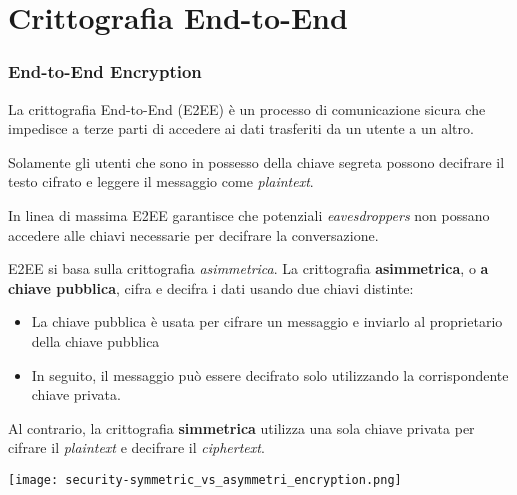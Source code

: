 \section{Crittografia End-to-End}
\begin{frame}
    \frametitle{End-to-End Encryption}
    La crittografia End-to-End (E2EE) è un processo di comunicazione sicura che impedisce a terze parti di accedere ai dati trasferiti da un utente a un altro.\newline\pause
    
    Solamente gli utenti che sono in possesso della chiave segreta possono decifrare il testo cifrato e leggere il messaggio come \textit{plaintext}.\newline\pause

    In linea di massima E2EE garantisce che potenziali \textit{eavesdroppers} non possano accedere alle chiavi necessarie per decifrare la conversazione. 
    \cite{greenbergE2EE}


\end{frame}

\begin{frame}
    E2EE si basa sulla crittografia \textit{asimmetrica}.\newline
    La crittografia \textbf{asimmetrica}, o \textbf{a chiave pubblica}, cifra e decifra i dati usando due chiavi distinte:\pause
    \begin{itemize}
        \item La chiave pubblica è usata per cifrare un messaggio e inviarlo al proprietario della chiave pubblica\pause
        \item In seguito, il messaggio può essere decifrato solo utilizzando la corrispondente chiave privata.\pause
    \end{itemize}

    Al contrario, la crittografia \textbf{simmetrica} utilizza una sola chiave privata per cifrare il \textit{plaintext} e decifrare il \textit{ciphertext}.


\end{frame}

\begin{frame}
    \texttt{[image: security-symmetric\_vs\_asymmetri\_encryption.png]}   
\end{frame}


